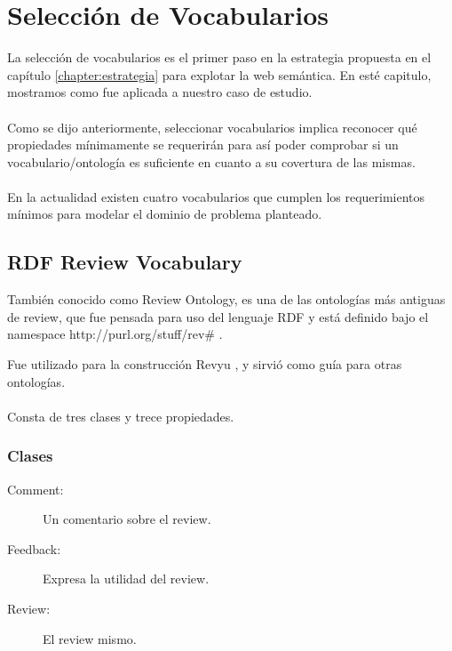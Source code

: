 \chapter{Selección de Vocabularios}
\label{chapter:seleccion}
La selección de vocabularios es el primer paso en la estrategia propuesta en el capítulo \ref{chapter:estrategia} para explotar la web semántica. En esté capitulo, mostramos como fue aplicada a nuestro caso de estudio.
\\\\
Como se dijo anteriormente, seleccionar vocabularios implica reconocer qué propiedades mínimamente se requerirán para así poder comprobar 
si un vocabulario/ontología es suficiente en cuanto a su covertura de las mismas.\\\\

En la actualidad existen cuatro vocabularios que cumplen los requerimientos mínimos para modelar el dominio de problema planteado.

\section{RDF Review Vocabulary}
\label{section:review-ontology}

También conocido como Review Ontology, es una de las ontologías más antiguas de review, que fue pensada para uso del lenguaje 
RDF y está definido bajo el namespace http://purl.org/stuff/rev\# .

Fue utilizado para la construcción Revyu , y sirvió como guía para otras ontologías.
\\\\
Consta de tres clases y trece propiedades.
\subsection{Clases}
\begin{description}
  \item [Comment:] Un comentario sobre el review. 
  \item [Feedback:] Expresa la utilidad del review. 
  \item [Review:] El review mismo. 
\end{description}


